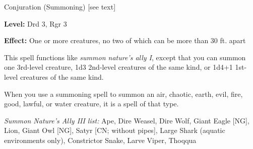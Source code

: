 
Conjuration (Summoning) [see text]

\textbf{Level:} Drd 3, Rgr 3

\textbf{Effect:} One or more creatures, no two of which can be more than 30 ft. 
apart

This spell functions like \textit{summon nature's ally I}, except that you can 
summon one 3rd-level creature, 1d3 2nd-level creatures of the same kind, or 1d4+1 
1st-level creatures of the same kind.

When you use a summoning spell to summon an air, chaotic, earth, evil, fire, good, 
lawful, or water creature, it is a spell of that type. 

\textit{Summon Nature's Ally III list:} Ape, Dire Weasel, Dire Wolf, Giant Eagle [NG], Lion, Giant Owl [NG], Satyr [CN; without pipes], Large Shark (aquatic environments only), Constrictor Snake, Larve Viper, Thoqqua
